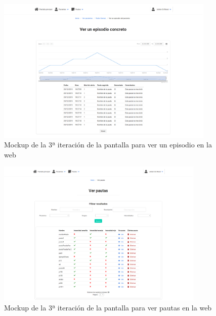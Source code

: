 \begin{figure}[H]
    \centering
    \includegraphics[height=7cm, width=\textwidth]{Imagenes/04DescProblema/mockups/v3/web/09-verEpisodio.png}
    \caption[Mockup de la 3ª iteración de la pantalla para ver un episodio en la web]{Mockup de la 3ª iteración de la pantalla para ver un episodio en la web}
    \label{c4:fig:v3:web:episodio}
\end{figure}

\begin{figure}[H]
    \centering
    \includegraphics[height=7cm, width=\textwidth]{Imagenes/04DescProblema/mockups/v3/web/10-verPautas.png}
    \caption[Mockup de la 3ª iteración de la pantalla para ver pautas en la web]{Mockup de la 3ª iteración de la pantalla para ver pautas en la web}
    \label{c4:fig:v3:web:verPautas}
\end{figure}


